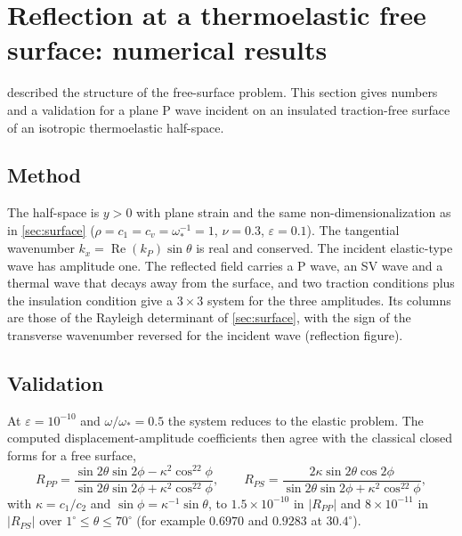 \section{Reflection at a thermoelastic free surface: numerical results}\label{sec:reflection}

 described the structure of the free-surface problem. This section gives numbers and a validation for a plane P wave incident on an insulated traction-free surface of an isotropic thermoelastic half-space.

\subsection{Method}
The half-space is $y>0$ with plane strain and the same non-dimensionalization as in \cref{sec:surface} ($\rho=c_1=c_v=\omega_*^{-1}=1$, $\nu=0.3$, $\varepsilon=0.1$). The tangential wavenumber $k_x=\operatorname{Re}(k_P)\sin\theta$ is real and conserved. The incident elastic-type wave has amplitude one. The reflected field carries a P wave, an SV wave and a thermal wave that decays away from the surface, and two traction conditions plus the insulation condition give a $3\times3$ system for the three amplitudes. Its columns are those of the Rayleigh determinant of \cref{sec:surface}, with the sign of the transverse wavenumber reversed for the incident wave (reflection figure).

\subsection{Validation}
At $\varepsilon=10^{-10}$ and $\omega/\omega_*=0.5$ the system reduces to the elastic problem. The computed displacement-amplitude coefficients then agree with the classical closed forms for a free surface,
\begin{equation}
R_{PP}=\frac{\sin2\theta\sin2\phi-\kappa^2\cos^22\phi}{\sin2\theta\sin2\phi+\kappa^2\cos^22\phi},\qquad
R_{PS}=\frac{2\kappa\sin2\theta\cos2\phi}{\sin2\theta\sin2\phi+\kappa^2\cos^22\phi},
\end{equation}
with $\kappa=c_1/c_2$ and $\sin\phi=\kappa^{-1}\sin\theta$, to $1.5\times10^{-10}$ in $|R_{PP}|$ and $8\times10^{-11}$ in $|R_{PS}|$ over $1^\circ\le\theta\le70^\circ$ (for example $0.6970$ and $0.9283$ at $30.4^\circ$).

